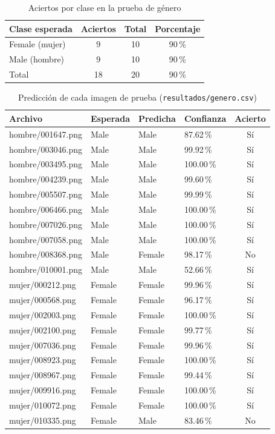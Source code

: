 \documentclass[a4paper,11pt]{article}
\begin{document}
  \begin{table}[H]
    \centering
    \caption{Aciertos por clase en la prueba de género}
    \label{tab:resumen}
    \begin{tabular}{lccc}
      \toprule
      Clase esperada & Aciertos & Total & Porcentaje \\
      \midrule
      Female (mujer) & 9 & 10 & 90\,\% \\
      Male (hombre) & 9 & 10 & 90\,\% \\
      \midrule
      Total & 18 & 20 & 90\,\% \\
      \bottomrule
    \end{tabular}
  \end{table}

  \begin{table}[H]
    \centering
    \small
    \caption{Predicción de cada imagen de prueba (\texttt{resultados/genero.csv})}
    \label{tab:imagenes}
    \begin{tabular}{llllc}
      \toprule
      Archivo & Esperada & Predicha & Confianza & Acierto \\
      \midrule
      hombre/001647.png & Male & Male & 87.62\,\% & Sí \\
      hombre/003046.png & Male & Male & 99.92\,\% & Sí \\
      hombre/003495.png & Male & Male & 100.00\,\% & Sí \\
      hombre/004239.png & Male & Male & 99.60\,\% & Sí \\
      hombre/005507.png & Male & Male & 99.99\,\% & Sí \\
      hombre/006466.png & Male & Male & 100.00\,\% & Sí \\
      hombre/007026.png & Male & Male & 100.00\,\% & Sí \\
      hombre/007058.png & Male & Male & 100.00\,\% & Sí \\
      hombre/008368.png & Male & Female & 98.17\,\% & No \\
      hombre/010001.png & Male & Male & 52.66\,\% & Sí \\
      mujer/000212.png & Female & Female & 99.96\,\% & Sí \\
      mujer/000568.png & Female & Female & 96.17\,\% & Sí \\
      mujer/002003.png & Female & Female & 100.00\,\% & Sí \\
      mujer/002100.png & Female & Female & 99.77\,\% & Sí \\
      mujer/007036.png & Female & Female & 99.96\,\% & Sí \\
      mujer/008923.png & Female & Female & 100.00\,\% & Sí \\
      mujer/008967.png & Female & Female & 99.44\,\% & Sí \\
      mujer/009916.png & Female & Female & 100.00\,\% & Sí \\
      mujer/010072.png & Female & Female & 100.00\,\% & Sí \\
      mujer/010335.png & Female & Male & 83.46\,\% & No \\
      \bottomrule
    \end{tabular}
  \end{table}
\end{document}
